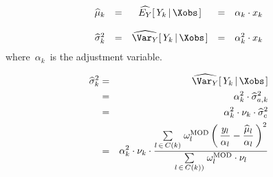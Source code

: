 \begin{equation*}
\begin{array}{ccccc}
\widehat{\mu}_{k}
& = &
    \widehat{E_{Y}}\!\left[\,Y_{k}\left\vert\,\Xobs\right.\right]
& = &
    \alpha_{k} \cdot x_{k}
\\ \\
\widehat{\sigma}_{k}^{2}
& = &
    \widehat{\Var_{Y}}\!\left[\,Y_{k}\left\vert\,\Xobs\right.\right]
& = &
    \alpha_{k}^{2} \cdot x_{k}
\end{array}
\end{equation*}
where
\,$\alpha_{k}$\, is the adjustment variable.

\begin{eqnarray*}
\widehat{\sigma}_{k}^{2}
& = &
    \widehat{\Var_{Y}}\!\left[\,Y_{k}\left\vert\,\Xobs\right.\right]
\\
& = &
    \alpha_{k}^{2}\cdot\widehat{\sigma}_{a,k}^{2}
\\
& = &
    \alpha_{k}^{2}\cdot\nu_{k}\cdot\widehat{\sigma}_{c}^{2}
\\
& = &
    \alpha_{k}^{2}\cdot\nu_{k}\cdot
    \dfrac{
        \underset{l\,\in\,C(k)}{\sum}\;
        \omega^{\textnormal{MOD}}_{l}
        \left(\,\dfrac{y_{l}}{\alpha_{l}} - \dfrac{\widehat{\mu}_{l}}{\alpha_{l}}\,\right)^{2}
        }{
        \underset{l\,\in\,C(k))}{\sum}\;
        \omega^{\textnormal{MOD}}_{l}\cdot\nu_{l}
        }
\end{eqnarray*}

